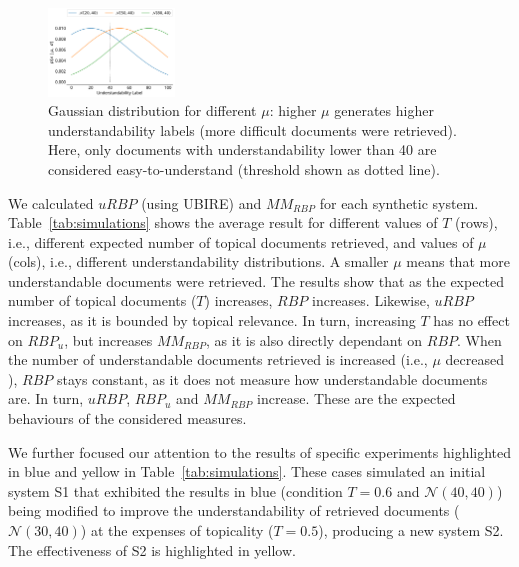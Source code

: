 \begin{figure}[t!]
  \centering
   \includegraphics[width=0.30\textwidth]{figs/gaussians2}
    \vspace{-.2cm}
    \caption{Gaussian distribution for different $\mu$: higher $\mu$ generates higher understandability labels (more difficult documents were retrieved). Here, only documents with understandability lower than 40 are considered easy-to-understand (threshold shown as dotted line). \vspace{-16pt}}
  \label{fig:gaussians}
\end{figure}

We calculated $uRBP$ (using UBIRE) and $MM_{RBP}$ for each synthetic system.
Table~\ref{tab:simulations} shows the average result for different values of $T$ (rows), i.e., different expected number of topical documents retrieved, and values of $\mu$ (cols), i.e., different understandability distributions.
A smaller $\mu$ means that more understandable documents were retrieved. The results show that as the expected number of topical documents ($T$) increases, $RBP$ increases. Likewise, $uRBP$ increases, as it is bounded by topical relevance.
In turn, increasing $T$ has no effect on $RBP_u$, but increases $MM_{RBP}$, as it is also directly dependant on $RBP$. When the number of understandable documents retrieved is increased (i.e., $\mu$ decreased ), $RBP$ stays constant, as it does not measure how understandable documents are.
In turn, $uRBP$, $RBP_u$ and $MM_{RBP}$ increase. 
These are the expected behaviours of the considered measures. %

We further focused our attention to the results of specific experiments highlighted in blue and yellow in Table~\ref{tab:simulations}. These cases simulated an initial system S1 that exhibited the results in blue (condition $T=0.6$ and $\mathcal{N}(40,40)$) being modified to improve the understandability of retrieved documents ($\mathcal{N}(30,40)$) at the expenses of topicality ($T=0.5$), producing a new system S2. The effectiveness of S2 is highlighted in yellow. 

